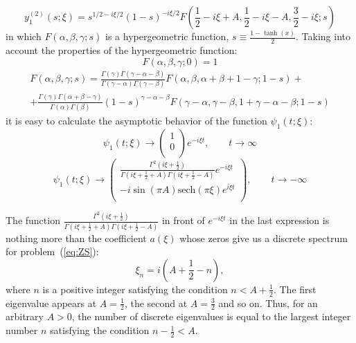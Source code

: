 \begin{equation}
    y_1^{(2)} (s; \xi) = s^{1/2 - i\xi/2}(1 - s)^{-i\xi/2} F \left(\frac{1}{2} - i\xi + A, \frac{1}{2} - i\xi - A, \frac{3}{2} - i\xi; s\right)
\end{equation}
in which $ F (\alpha, \beta, \gamma; s) $ is a hypergeometric function, $ s \equiv \frac{1 - \tanh (x)}{2} $.
Taking into account the properties of the hypergeometric function:
\begin{equation}
F(\alpha, \beta, \gamma; 0) = 1 \nonumber
\end{equation}
\begin{eqnarray}
F(\alpha, \beta, \gamma; s) = \frac{\Gamma(\gamma)\Gamma(\gamma - \alpha - \beta)}{\Gamma(\gamma - \alpha)\Gamma(\gamma - \beta)}F(\alpha, \beta, \alpha + \beta + 1 - \gamma; 1 - s) + \nonumber \\
+ \frac{\Gamma(\gamma)\Gamma(\alpha + \beta - \gamma)}{\Gamma(\alpha)\Gamma(\beta)}(1 - s)^{\gamma - \alpha - \beta}F(\gamma - \alpha, \gamma - \beta, 1 + \gamma - \alpha - \beta; 1 - s) \nonumber
\end{eqnarray}
it is easy to calculate the asymptotic behavior of the function $ \psi_1 (t; \xi) $:
\begin{equation}
    \psi_1(t; \xi) \to 
    \begin{pmatrix}
        1 \\
        0\\
    \end{pmatrix}
    e^{-i\xi t} {,} \qquad t \to \infty
\end{equation}
\begin{equation}
    \psi_1(t; \xi) \to 
    \begin{pmatrix}
        \frac{\Gamma^2(i\xi + \frac{1}{2})}{\Gamma(i\xi + \frac{1}{2} + A) \Gamma(i\xi + \frac{1}{2} -A)} e^{-i\xi t} \\
        -i \sin(\pi A) \mathrm{sech}(\pi \xi) e^{i\xi t} \\
    \end{pmatrix}
    {,} \qquad t \to -\infty
\end{equation}

The function
$\frac{\Gamma^2(i\xi + \frac{1}{2})}{\Gamma(i\xi + \frac{1}{2} + A) \Gamma(i\xi + \frac{1}{2} -A)}$
in front of $ e ^ {- i \xi t} $ in the last expression is nothing more than the coefficient $ a (\xi) $ whose zeros give us a discrete spectrum for problem~(\ref{eq:ZS}):
\begin{equation}
    \xi_n = i \left( A + \frac{1}{2} -n \right),
\end{equation}
where $ n $ is a positive integer satisfying the condition $ n <A + \frac{1}{2}$. The first eigenvalue appears at $ A = \frac{1}{2} $, the second at $ A = \frac{3}{2} $ and so on. Thus, for an arbitrary $ A> 0 $, the number of discrete eigenvalues is equal to the largest integer number $ n $ satisfying the condition $ n - \frac{1}{2} <A $.

